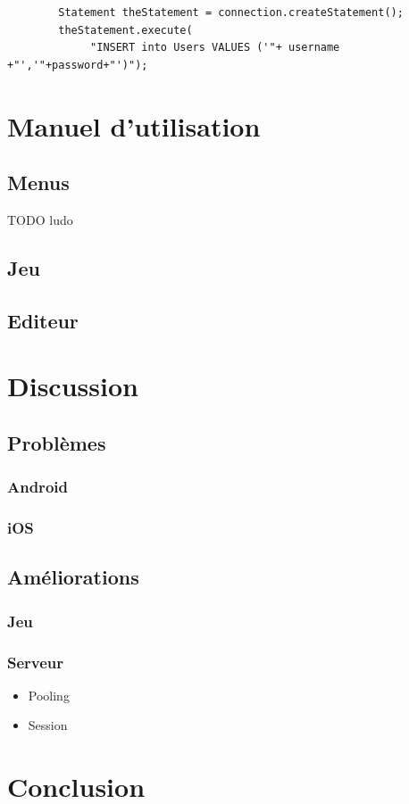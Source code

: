 \documentclass[a4paper,11pt]{report}
\begin{document}
		\begin{verbatim}
		Statement theStatement = connection.createStatement();
		theStatement.execute(
		     "INSERT into Users VALUES ('"+ username +"','"+password+"')");
		\end{verbatim}
		
		
		
		
\chapter{Manuel d'utilisation}
	\section{Menus}
	TODO ludo
	\section{Jeu}
	\section{Editeur}
	

\chapter{Discussion}
	\section{Problèmes}
		\subsection{Android}
		\subsection{iOS}
	\section{Améliorations}
		\subsection{Jeu}
		\subsection{Serveur}
			\begin{itemize}
				\item{Pooling}
				\item{Session}
			\end{itemize}
			
\chapter{Conclusion}
\end{document}

